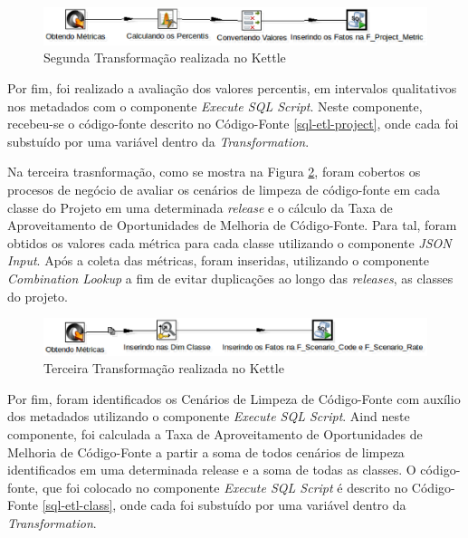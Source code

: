 \begin{apendicesenv}
\begin{figure}[H]
\centering
\includegraphics[keepaspectratio=false,scale=0.65]{figuras/second-transformation.eps}
\caption{Segunda Transformação realizada no Kettle}
\label{fig:second-transformation}
\end{figure}
\FloatBarrier

Por fim, foi realizado a avaliação dos valores percentis, em intervalos qualitativos nos metadados com o componente \textit{Execute SQL Script}. Neste componente, recebeu-se o código-fonte descrito no Código-Fonte \ref{sql-etl-project}, onde cada \? foi substuído por uma variável dentro da \textit{Transformation}.



Na terceira trasnformação, como se mostra na Figura \ref{fig:third-transformation}, foram cobertos os procesos de negócio de avaliar os cenários de limpeza de código-fonte em cada classe do Projeto em uma determinada \textit{release} e o cálculo da Taxa de Aproveitamento de Oportunidades de Melhoria de Código-Fonte. Para tal, foram obtidos os valores cada métrica para cada classe utilizando o componente \textit{JSON Input}. Após a coleta das métricas, foram inseridas, utilizando o componente \textit{Combination Lookup} a fim de evitar duplicações ao longo das \textit{releases}, as classes do projeto.


\begin{figure}[H]
\centering
\includegraphics[keepaspectratio=false,scale=0.65]{figuras/third-transformation.eps}
\caption{Terceira Transformação realizada no Kettle}
\label{fig:third-transformation}
\end{figure}
\FloatBarrier

Por fim, foram identificados os Cenários de Limpeza de Código-Fonte com auxílio dos metadados utilizando o componente \textit{Execute SQL Script}. Aind neste componente, foi calculada a Taxa de Aproveitamento de Oportunidades de Melhoria de Código-Fonte a partir a soma de todos cenários de limpeza identificados em uma determinada release e a soma de todas as classes. O código-fonte, que foi colocado no componente \textit{Execute SQL Script} é descrito no Código-Fonte \ref{sql-etl-class}, onde cada \? foi substuído por uma variável dentro da \textit{Transformation}.


\end{apendicesenv}
